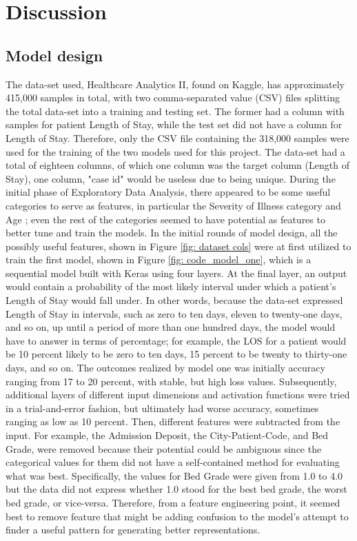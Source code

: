 \documentclass[sigconf,authorversion]{acmart}
\begin{document}
\section{Discussion}
\subsection{Model design}
The data-set used, Healthcare Analytics II, found on Kaggle, has approximately 415,000 samples in total, with two comma-separated value (CSV) files splitting the total data-set into a training and testing set. The former had a column with samples for patient Length of Stay, while the test set did not have a column for Length of Stay.  Therefore, only the CSV file containing the 318,000 samples were used for the training of the two models used for this project. The data-set had a total of eighteen columns, of which one column was the target column (Length of Stay), one column, "case id" would be useless due to being unique. During the initial phase of Exploratory Data Analysis, there appeared to be some useful categories to serve as features, in particular the Severity of Illness category and Age ; even the rest of the categories seemed to have potential as features to better tune and train the models. In the initial rounds of model design, all the possibly useful features, shown in Figure \ref{fig: dataset cols} were at first utilized to train the first model, shown in Figure \ref{fig: code_model_one}, which is a sequential model built with Keras using four layers. At the final layer, an output would contain a probability of the most likely interval under which a patient's Length of Stay would fall under. In other words, because the data-set expressed Length of Stay in intervals, such as zero to ten days, eleven to twenty-one days, and so on, up until a period of more than one hundred days, the model would have to answer in terms of percentage; for example, the LOS for a patient would be 10 percent likely to be zero to ten days, 15 percent to be twenty to thirty-one days, and so on. The outcomes realized by model one was initially accuracy ranging from 17 to 20 percent, with stable, but high loss values. Subsequently, additional layers of different input dimensions and activation functions were tried in a trial-and-error fashion, but ultimately had worse accuracy, sometimes ranging as low as 10 percent. Then, different features were subtracted from the input. For example, the Admission Deposit, the City-Patient-Code, and Bed Grade, were removed because their potential could be ambiguous since the categorical values for them did not have a self-contained method for evaluating what was best. Specifically, the values for Bed Grade were given from 1.0 to 4.0 but the data did not express whether 1.0 stood for the best bed grade, the worst bed grade, or vice-versa. Therefore, from a feature engineering point, it seemed best to remove feature that might be adding confusion to the model's attempt to finder a useful pattern for generating better representations.
\end{document}
